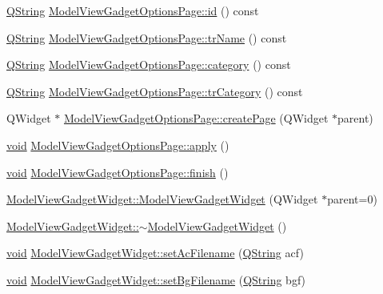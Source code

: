 \begin{DoxyCompactItemize}
\item 
\hyperlink{group___u_a_v_objects_plugin_gab9d252f49c333c94a72f97ce3105a32d}{Q\-String} \hyperlink{group___model_view_plugin_ga4ef97dfb27bc7bf0761a6ef8c9992461}{Model\-View\-Gadget\-Options\-Page\-::id} () const 
\item 
\hyperlink{group___u_a_v_objects_plugin_gab9d252f49c333c94a72f97ce3105a32d}{Q\-String} \hyperlink{group___model_view_plugin_ga957813f49ad4050f6d8fe39c8ddb8db9}{Model\-View\-Gadget\-Options\-Page\-::tr\-Name} () const 
\item 
\hyperlink{group___u_a_v_objects_plugin_gab9d252f49c333c94a72f97ce3105a32d}{Q\-String} \hyperlink{group___model_view_plugin_ga7ac23d7285b3e6b2541b45329d26d973}{Model\-View\-Gadget\-Options\-Page\-::category} () const 
\item 
\hyperlink{group___u_a_v_objects_plugin_gab9d252f49c333c94a72f97ce3105a32d}{Q\-String} \hyperlink{group___model_view_plugin_ga0026a37d0b02b743a513a6f79b88928e}{Model\-View\-Gadget\-Options\-Page\-::tr\-Category} () const 
\item 
Q\-Widget $\ast$ \hyperlink{group___model_view_plugin_ga5a42eda3ce28f2971be7b426347d588a}{Model\-View\-Gadget\-Options\-Page\-::create\-Page} (Q\-Widget $\ast$parent)
\item 
\hyperlink{group___u_a_v_objects_plugin_ga444cf2ff3f0ecbe028adce838d373f5c}{void} \hyperlink{group___model_view_plugin_ga77c3c23e38d3018c84f464c0ef5402e5}{Model\-View\-Gadget\-Options\-Page\-::apply} ()
\item 
\hyperlink{group___u_a_v_objects_plugin_ga444cf2ff3f0ecbe028adce838d373f5c}{void} \hyperlink{group___model_view_plugin_ga9ba47bc802df977b1f8cc5f1c8b70ca3}{Model\-View\-Gadget\-Options\-Page\-::finish} ()
\item 
\hyperlink{group___model_view_plugin_ga7b299b7e0c58f0bca02228b6376370a6}{Model\-View\-Gadget\-Widget\-::\-Model\-View\-Gadget\-Widget} (Q\-Widget $\ast$parent=0)
\item 
\hyperlink{group___model_view_plugin_gafd8359344ca9b61a21a93e1256e9247a}{Model\-View\-Gadget\-Widget\-::$\sim$\-Model\-View\-Gadget\-Widget} ()
\item 
\hyperlink{group___u_a_v_objects_plugin_ga444cf2ff3f0ecbe028adce838d373f5c}{void} \hyperlink{group___model_view_plugin_ga61a44ab1922172cfaee66b78fde29538}{Model\-View\-Gadget\-Widget\-::set\-Ac\-Filename} (\hyperlink{group___u_a_v_objects_plugin_gab9d252f49c333c94a72f97ce3105a32d}{Q\-String} acf)
\item 
\hyperlink{group___u_a_v_objects_plugin_ga444cf2ff3f0ecbe028adce838d373f5c}{void} \hyperlink{group___model_view_plugin_gab29343cadc70576f4b7d8f91dd1a3863}{Model\-View\-Gadget\-Widget\-::set\-Bg\-Filename} (\hyperlink{group___u_a_v_objects_plugin_gab9d252f49c333c94a72f97ce3105a32d}{Q\-String} bgf)

\end{DoxyCompactItemize}
